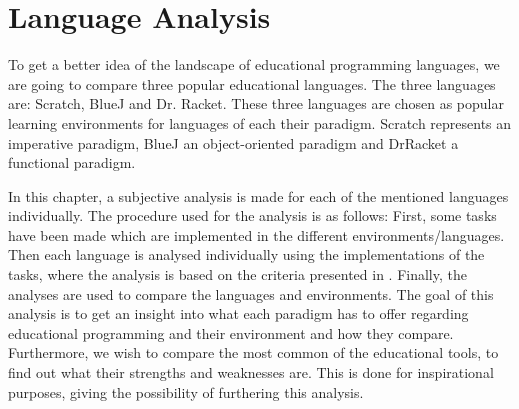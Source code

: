 \chapter{Language Analysis}
\label{chap:language_analysis}
To get a better idea of the landscape of educational programming languages, we are going to compare three popular educational languages.
The three languages are: Scratch, BlueJ and Dr. Racket.
These three languages are chosen as popular learning environments for languages of each their paradigm.
Scratch represents an imperative paradigm, BlueJ an object-oriented paradigm and DrRacket a functional paradigm.

In this chapter, a subjective analysis is made for each of the mentioned languages individually. The procedure used for the analysis is as follows: First, some tasks have been made which are implemented in the different environments/languages. Then each language is analysed individually using the implementations of the tasks, where the analysis is based on the criteria presented in . Finally, the analyses are used to compare the languages and environments. The goal of this analysis is to get an insight into what each paradigm has to offer regarding educational programming and their environment and how they compare. Furthermore, we wish to compare the most common of the educational tools, to find out what their strengths and weaknesses are. This is done for inspirational purposes, giving the possibility of furthering this analysis.

